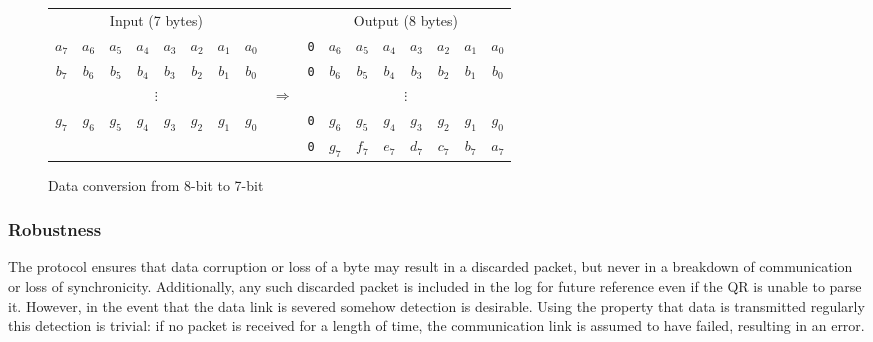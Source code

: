 \documentclass[11pt]{article}
\begin{document}
\begin{figure}[h]
\centering
	\begin{tabular}{|cccccccc| c |cccccccc|}

		\multicolumn{8}{c}{Input (7 bytes)}	& \multicolumn{1}{c}{}	&	\multicolumn{8}{c}{Output (8 bytes)}	\\
		
		\cline{1-8}
		\cline{10-17}
			
		$a_7$ & $a_6$ & $a_5$ & $a_4$ & $a_3$ & $a_2$ & $a_1$ & $a_0$ &
		&
		\verb=0= & $a_6$ & $a_5$ & $a_4$ & $a_3$ & $a_2$ & $a_1$ & $a_0$ \\

		\cline{1-8}
		\cline{10-17}

		$b_7$ & $b_6$ & $b_5$ & $b_4$ & $b_3$ & $b_2$ & $b_1$ & $b_0$ &
		&
		\verb=0= & $b_6$ & $b_5$ & $b_4$ & $b_3$ & $b_2$ & $b_1$ & $b_0$ \\

		\cline{1-8}
		\cline{10-17}

		\multicolumn{8}{c}{$\vdots$}	& \multicolumn{1}{c}{$\Longrightarrow$}	&	\multicolumn{8}{c}{$\vdots$}	\\

		\cline{1-8}
		\cline{10-17}

		$g_7$ & $g_6$ & $g_5$ & $g_4$ & $g_3$ & $g_2$ & $g_1$ & $g_0$ &
		&
		\verb=0= & $g_6$ & $g_5$ & $g_4$ & $g_3$ & $g_2$ & $g_1$ & $g_0$ \\

		\cline{1-8}
		\cline{10-17}

		\multicolumn{9}{c|}{}	&
		\verb=0= & $g_7$ & $f_7$ & $e_7$ & $d_7$ & $c_7$ & $b_7$ & $a_7$ \\

		\cline{10-17}
	\end{tabular}
	\caption{Data conversion from 8-bit to 7-bit}
	\label{dataconversion}
\end{figure}

\subsubsection{Robustness}
The protocol ensures that data corruption or loss of a byte may result in a discarded packet, but never in a breakdown of communication or loss of synchronicity. Additionally, any such discarded packet is included in the log for future reference even if the QR is unable to parse it. However, in the event that the data link is severed somehow detection is desirable. Using the property that data is transmitted regularly this detection is trivial: if no packet is received for a length of time, the communication link is assumed to have failed, resulting in an error.
\end{document}
